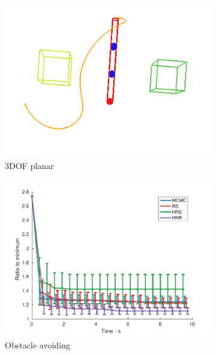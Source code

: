 \documentclass[letterpaper, 10 pt, conference]{ieeeconf}  %
\begin{document}
\begin{figure}[t!]
	\centering
	\begin{subfigure}[b]{0.5\textwidth}
		\includegraphics[width=\linewidth]{fig/planning_efficiency/3dof_example}
		\caption{3DOF planar}
		\label{fig:planning_efficiency:3dof:example}
	\end{subfigure}
	\begin{subfigure}[b]{0.5\textwidth}
		\includegraphics[width=\linewidth]{fig/planning_efficiency/3dof_general}
		\caption{Obstacle avoiding}
		\label{fig:planning_efficiency:3dof:general}
	\end{subfigure}	
	\begin{subfigure}[b]{0.5\textwidth}

\end{subfigure}
\end{figure}
\end{document}

